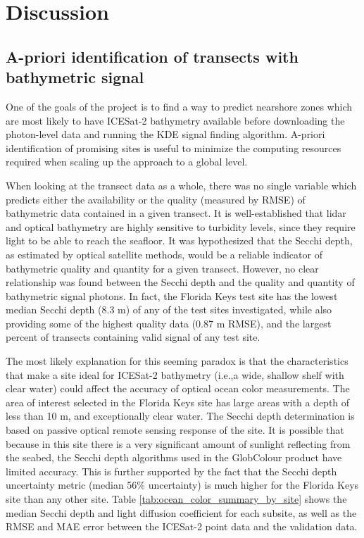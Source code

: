 \chapter{Discussion}

\section{A-priori identification of transects with bathymetric signal}
One of the goals of the project is to find a way to predict nearshore zones which are most likely to have ICESat-2 bathymetry available before downloading the photon-level data and running the KDE signal finding algorithm. A-priori identification of promising sites is useful to minimize the computing resources required when scaling up the approach to a global level.

When looking at the transect data as a whole, there was no single variable which predicts either the availability or the quality (measured by RMSE) of bathymetric data contained in a given transect. It is well-established that lidar and optical bathymetry are highly sensitive to turbidity levels, since they require light to be able to reach the seafloor. It was hypothesized that the Secchi depth, as estimated by optical satellite methods, would be a reliable indicator of bathymetric quality and quantity for a given transect. However, no clear relationship was found between the Secchi depth and the quality and quantity of bathymetric signal photons. In fact, the Florida Keys test site has the lowest median Secchi depth (8.3 m) of any of the test sites investigated, while also providing some of the highest quality data (0.87 m RMSE), and the largest percent of transects containing valid signal of any test site. 

The most likely explanation for this seeming paradox is that the characteristics that make a site ideal for ICESat-2 bathymetry (i.e.,a wide, shallow shelf with clear water) could affect the accuracy of optical ocean color measurements. The area of interest selected in the Florida Keys site has large areas with a depth of less than 10 m, and exceptionally clear water. The Secchi depth determination is based on passive optical remote sensing response of the site. It is possible that because in this site there is a very significant amount of sunlight reflecting from the seabed, the Secchi depth algorithms used in the GlobColour product have limited accuracy. This is further supported by the fact that the Secchi depth uncertainty metric (median 56\% uncertainty) is much higher for the Florida Keys site than any other site. Table \ref{tab:ocean_color_summary_by_site} shows the median Secchi depth and light diffusion coefficient for each subsite, as well as the RMSE and MAE error between the ICESat-2 point data and the validation data.


